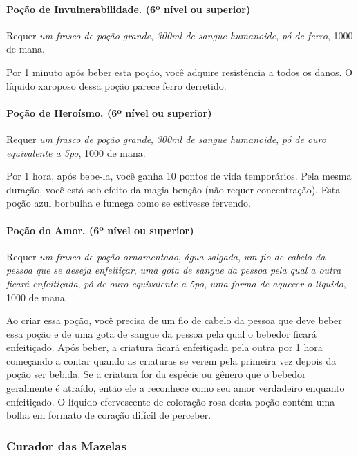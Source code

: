 \begin{multicols}{2}
\paragraph{Poção de Invulnerabilidade. (6º nível ou superior)}

Requer \textit{um frasco de poção grande}, \textit{300ml de sangue humanoide},
\textit{pó de ferro}, 1000 de mana.

Por 1 minuto após beber esta poção, você adquire resistência a todos os danos. O
líquido xaroposo dessa poção parece ferro derretido.

\paragraph{Poção de Heroísmo. (6º nível ou superior)}

Requer \textit{um frasco de poção grande}, \textit{300ml de sangue humanoide},
\textit{pó de ouro equivalente a 5po}, 1000 de mana.

Por 1 hora, após bebe-la, você ganha 10 pontos de vida temporários. Pela mesma
duração, você está sob efeito da magia benção (não requer concentração). Esta
poção azul borbulha e fumega como se estivesse fervendo.

\paragraph{Poção do Amor. (6º nível ou superior)}

Requer \textit{um frasco de poção ornamentado}, \textit{água salgada},
\textit{um fio de cabelo da pessoa que se deseja enfeitiçar}, \textit{uma gota
de sangue da pessoa pela qual a outra ficará enfeitiçada}, \textit{pó de ouro
equivalente a 5po}, \textit{uma forma de aquecer o líquido}, 1000 de mana.

Ao criar essa poção, você precisa de um fio de cabelo da pessoa que deve beber
essa poção e de uma gota de sangue da pessoa pela qual o bebedor ficará
enfeitiçado. Após beber, a criatura ficará enfeitiçada pela outra por 1 hora
começando a contar quando as criaturas se verem pela primeira vez depois da
poção ser bebida. Se a criatura for da espécie ou gênero que o bebedor
geralmente é atraído, então ele a reconhece como seu amor verdadeiro enquanto
enfeitiçado. O líquido efervescente de coloração rosa desta poção contém uma
bolha em formato de coração difícil de perceber.

\subsubsection*{Curador das Mazelas}%


\end{multicols}
